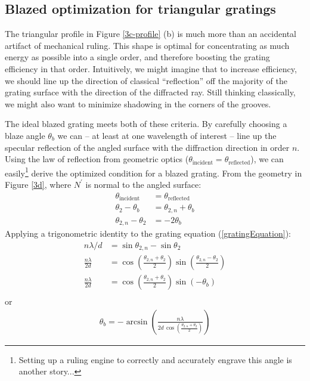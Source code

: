 \subsection{Blazed optimization for triangular gratings}
\label{blazeAngle}
The triangular profile in Figure \ref{3c-profile} (b) is much more than an accidental artifact of mechanical ruling.  This shape is optimal for concentrating as much energy as possible into a single order, and therefore boosting the grating efficiency in that order.  Intuitively, we might imagine that to increase efficiency, we should line up the direction of classical ``reflection'' off the majority of the grating surface with the direction of the diffracted ray.  Still thinking classically, we might also want to minimize shadowing in the corners of the grooves. 

The ideal blazed grating meets both of these criteria.  By carefully choosing a blaze angle $\theta_b$ we can -- at least at one wavelength of interest -- line up the specular reflection of the angled surface with the diffraction direction in order $n$.  Using the law of reflection from geometric optics ($\theta_{\mathrm{incident}} = \theta_{\mathrm{reflected}}$), we can easily\footnote{Setting up a ruling engine to correctly and accurately engrave this angle is another story...} derive the optimized condition for a blazed grating.  From the geometry in Figure \ref{3d}, where $N^\prime$ is normal to the angled surface: 
\begin{align}
\theta_{\mathrm{incident}} &= \theta_{\mathrm{reflected}} \\
\theta_2 - \theta_b &= \theta_{2,n} + \theta_b \\
\theta_{2,n} - \theta_{2} &= -2 \theta_b
\end{align}
Applying a trigonometric identity to the grating equation (\ref{gratingEquation}):
\begin{align}
n\lambda / d &= \sin\theta_{2,n} - \sin\theta_{2} \\
\frac{n\lambda}{2d} &= \cos \left( \frac{\theta_{2,n} + \theta_{2}}{2} \right) \sin \left( \frac{\theta_{2,n} - \theta_{2}}{2} \right) \\
\frac{n\lambda}{2d} &= \cos \left( \frac{\theta_{2,n} + \theta_{2}}{2} \right) \sin \left( -\theta_b \right) \\
\end{align}
or
\begin{align}
\label{blazeAngleEqn}
\theta_b = -\arcsin \left(   \frac{n \lambda}{2d \, \cos \left( \frac{\theta_{2,n} + \theta_{2}}{2} \right)}     \right)
\end{align}

